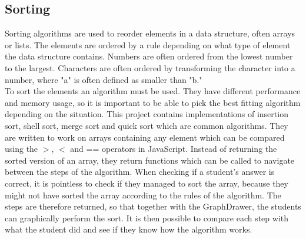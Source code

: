 \subsection{Sorting}
Sorting algorithms are used to reorder elements in a data structure, often arrays or lists. The elements are ordered by a rule depending on what type of element the data structure contains. Numbers are often ordered from the lowest number to the largest. Characters are often ordered by transforming the character into a number, where "a" is often defined as smaller than "b."
\\[11pt]
To sort the elements an algorithm must be used. They have different performance and memory usage, so it is important to be able to pick the best fitting algorithm depending on the situation. This project contains implementations of insertion sort, shell sort, merge sort and quick sort which are common algorithms. They are written to work on arrays containing any element which can be compared using the $>$, $<$ and == operators in JavaScript. Instead of returning the sorted version of an array, they return functions which can be called to navigate between the steps of the algorithm. When checking if a student's answer is correct, it is pointless to check if they managed to sort the array, because they might not have sorted the array according to the rules of the algorithm. The steps are therefore returned, so that together with the GraphDrawer, the students can graphically perform the sort. It is then possible to compare each step with what the student did and see if they know how the algorithm works.




